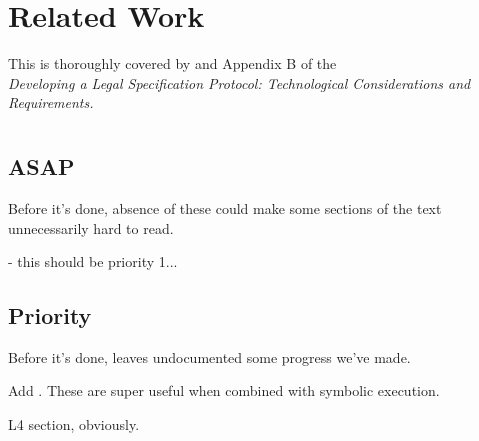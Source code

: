 \documentclass[12pt]{article}
\begin{document}
\section{Related Work}

This is thoroughly covered by  and Appendix B of the \\  {\it Developing a Legal Specification Protocol: Technological Considerations and Requirements.}


\section{\texorpdfstring{}{Dustin's todo}}
\subsection{ASAP}
Before it's done, absence of these could make some sections of the text unnecessarily hard to read.
\begin{LPPI}
\item {} - this should be priority 1...
\item {}
\end{LPPI}

\subsection{Priority}
Before it's done, leaves undocumented some progress we've made.
\begin{LPPI}
\item Add . These are super useful when combined with symbolic execution.
\item L4 section, obviously.
\end{LPPI}
\end{document}
